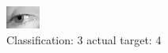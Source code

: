 \begin{figure}[h!]
\begin{center}
\includegraphics[width=0.60\columnwidth]{figures/ID2891_class_3_target_4.png}
\end{center}
\caption{ Classification: 3 actual target: 4}
\label{fig:ID2891_class_3_target_4}
\end{figure}
